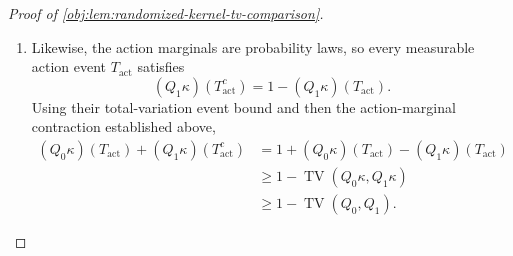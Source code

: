 \begin{proof}[Proof of \cref{obj:lem:randomized-kernel-tv-comparison}]
\begin{enumerate}
\item Likewise, the action marginals are probability laws, so every measurable action event \(T_{\mathrm{act}}\) satisfies
\[
(Q_1\kappa)(T_{\mathrm{act}}^c)
=
1-(Q_1\kappa)(T_{\mathrm{act}}).
\]
Using their total-variation event bound and then the action-marginal contraction established above,
\[
\begin{aligned}
(Q_0\kappa)(T_{\mathrm{act}})
 +(Q_1\kappa)(T_{\mathrm{act}}^c)
&=
1+(Q_0\kappa)(T_{\mathrm{act}})
 -(Q_1\kappa)(T_{\mathrm{act}})\\
&\ge
1-\operatorname{TV}(Q_0\kappa,Q_1\kappa)\\
&\ge
1-\operatorname{TV}(Q_0,Q_1).
\end{aligned}
\]
\end{enumerate}
\end{proof}
